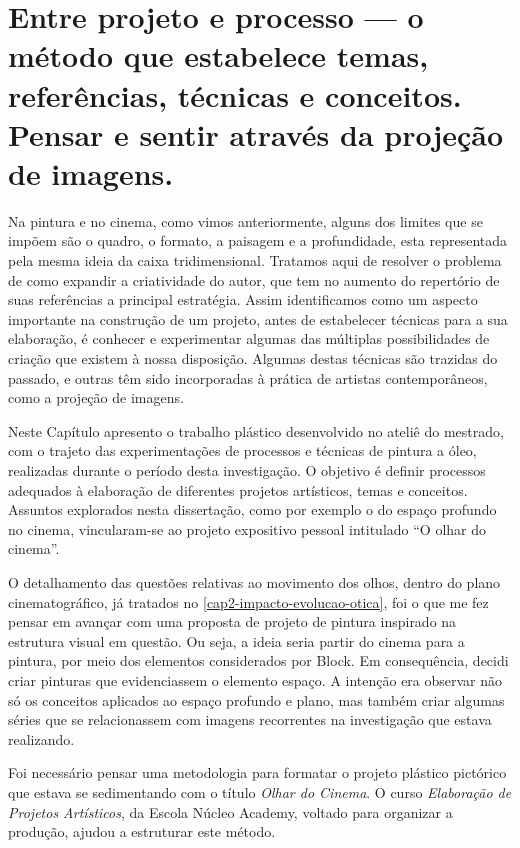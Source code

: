 \chapter{Entre projeto e processo --- o método que
  estabelece temas, referências, técnicas e conceitos. Pensar e sentir
  através da projeção de imagens.}%
\label{cap4-entre-projeto-processo}

Na pintura e no cinema, como vimos anteriormente, alguns dos limites
que se impõem são o quadro, o formato, a paisagem e a profundidade,
esta representada pela mesma ideia da caixa tridimensional. Tratamos
aqui de resolver o problema de como expandir a criatividade do autor,
que tem no aumento do repertório de suas referências a principal
estratégia. Assim identificamos como um aspecto importante na
construção de um projeto, antes de estabelecer técnicas para a sua
elaboração, é conhecer e experimentar algumas das múltiplas
possibilidades de criação que existem à nossa disposição. Algumas
destas técnicas são trazidas do passado, e outras têm sido incorporadas
à prática de artistas contemporâneos, como a projeção de imagens.

Neste Capítulo apresento o trabalho plástico desenvolvido no ateliê do
mestrado, com o trajeto das experimentações de processos e técnicas de
pintura a óleo, realizadas durante o período desta investigação. O
objetivo é definir processos adequados à elaboração de diferentes
projetos artísticos, temas e conceitos. Assuntos explorados nesta
dissertação, como por exemplo o do espaço profundo no cinema,
vincularam-se ao projeto expositivo pessoal intitulado \enquote{O olhar
	do cinema}.

O detalhamento das questões relativas ao movimento dos olhos, dentro do
plano cinematográfico, já tratados no
\cref{cap2-impacto-evolucao-otica}, foi o que me fez pensar em avançar
com uma proposta de projeto de pintura inspirado na estrutura visual em
questão. Ou seja, a ideia seria partir do cinema para a pintura, por
meio dos elementos considerados por Block. Em consequência, decidi
criar pinturas que evidenciassem o elemento espaço. A intenção era
observar não só os conceitos aplicados ao espaço profundo e plano, mas
também criar algumas séries que se relacionassem com imagens
recorrentes na investigação que estava realizando.

Foi necessário pensar uma metodologia para formatar o projeto plástico
pictórico que estava se sedimentando com o título \emph{Olhar do
	Cinema}. O curso \emph{Elaboração de Projetos Artísticos}, da Escola
Núcleo Academy, voltado para organizar a produção, ajudou a estruturar
este método.

